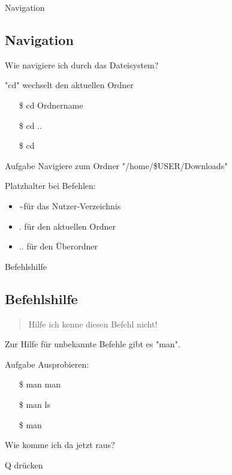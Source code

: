 \begin{frame}{Navigation}
    \subsection{Navigation}\label{subsec:navigation}
    \pause
    Wie navigiere ich durch das Dateisystem?
    \pause

    \textrightarrow "cd" wechselt den aktuellen Ordner
    \pause

    \begin{itemize}
        \item[\$] cd Ordnername\pause
        \item[\$] cd ..\pause
        \item[\$] cd
    \end{itemize}
    \pause

    \vspace{0.5cm}
    \begin{alertblock}{Aufgabe}
        Navigiere zum Ordner "/home/\$USER/Downloads"
    \end{alertblock}
    \pause

    Platzhalter bei Befehlen:

    \begin{itemize}
        \item \textasciitilde\space für das Nutzer-Verzeichnis\pause
        \item . für den aktuellen Ordner\pause
        \item .. für den Überordner
    \end{itemize}

\end{frame}

\begin{frame}{Befehlshilfe}
    \subsection{Befehlshilfe}\label{subsec:befehlshilfe}

    \pause
    \begin{quote}
        Hilfe ich kenne diesen Befehl nicht!
    \end{quote}
    \pause

    \textrightarrow Zur Hilfe für unbekannte Befehle gibt es "man".
    \pause

    \vspace{0.5cm}
    \begin{alertblock}{Aufgabe}
        \pause
        Ausprobieren:
        \pause
        \begin{itemize}
            \item[\$] man man\pause
            \item[\$] man ls\pause
            \item[\$] man
        \end{itemize}
    \end{alertblock}
    \pause

    Wie komme ich da jetzt raus?
    \pause

    \textrightarrow Q drücken

\end{frame}

